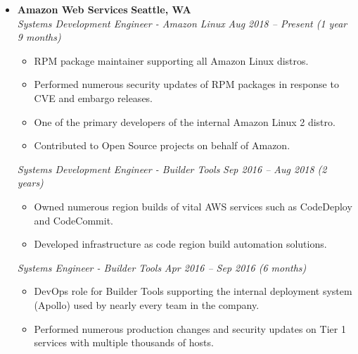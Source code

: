 \begin{itemize}
    \item
    \headerrow
    {\textbf{Amazon Web Services}}
        {\textbf{Seattle, WA}}
    \\
    \headerrow
        {\emph{Systems Development Engineer - Amazon Linux}}
        {\emph{Aug 2018 -- Present (1 year 9 months)}}
    \begin{itemize}
        \item RPM package maintainer supporting all Amazon Linux
			distros.
        \item Performed numerous security updates of RPM packages in
			response to CVE and embargo releases.
		\item One of the primary developers of the internal Amazon Linux
			2 distro.
		\item Contributed to Open Source projects on behalf of Amazon.
    \end{itemize}

    \headerrow
        {\emph{Systems Development Engineer - Builder Tools}}
        {\emph{Sep 2016 -- Aug 2018 (2 years)}}
    \begin{itemize}
        \item Owned numerous region builds of vital AWS services such as
            CodeDeploy and CodeCommit.
        \item Developed infrastructure as code region build
            automation solutions.
    \end{itemize}

    \headerrow
        {\emph{Systems Engineer - Builder Tools}}
        {\emph{Apr 2016 -- Sep 2016 (6 months)}}
    \begin{itemize}
        \item DevOps role for Builder Tools supporting the internal
			deployment system (Apollo) used by nearly every team in the company.
        \item Performed numerous production changes and security updates
            on Tier 1 services with multiple thousands of hosts.
    \end{itemize}

\end{itemize}

